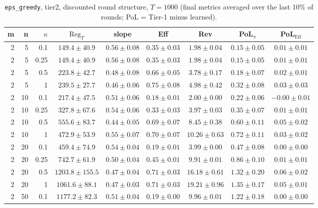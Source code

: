 \begin{table}[htbp]
\centering
\scriptsize
\caption{\texttt{eps\_greedy}, tier2, discounted round structure, $T=1000$ (final metrics averaged over the last 10\% of rounds; PoL = Tier-1 minus learned).}
\label{tab:tier2_eps_greedy_discounted}
\begin{tabular}{@{}rrrcccccc@{}}
\toprule
m & n & $\kappa$ & $\mathrm{Reg}_T$ & slope & Eff & Rev & PoL$_\pi$ & PoL$_\mathrm{Eff}$ \\
\midrule
2 & 5 & 0.1 & $149.4 \pm 40.9$ & $0.56 \pm 0.08$ & $0.35 \pm 0.03$ & $1.98 \pm 0.04$ & $0.15 \pm 0.05$ & $0.01 \pm 0.01$ \\
2 & 5 & 0.25 & $149.4 \pm 40.9$ & $0.56 \pm 0.08$ & $0.35 \pm 0.03$ & $1.98 \pm 0.04$ & $0.15 \pm 0.05$ & $0.01 \pm 0.01$ \\
2 & 5 & 0.5 & $223.8 \pm 42.7$ & $0.48 \pm 0.08$ & $0.66 \pm 0.05$ & $3.78 \pm 0.17$ & $0.18 \pm 0.07$ & $0.02 \pm 0.01$ \\
2 & 5 & 1 & $239.5 \pm 27.7$ & $0.46 \pm 0.06$ & $0.75 \pm 0.08$ & $4.98 \pm 0.42$ & $0.32 \pm 0.08$ & $0.03 \pm 0.03$ \\
2 & 10 & 0.1 & $217.4 \pm 47.5$ & $0.51 \pm 0.06$ & $0.18 \pm 0.01$ & $2.00 \pm 0.00$ & $0.22 \pm 0.06$ & $-0.00 \pm 0.01$ \\
2 & 10 & 0.25 & $327.8 \pm 67.6$ & $0.54 \pm 0.06$ & $0.33 \pm 0.03$ & $3.97 \pm 0.03$ & $0.35 \pm 0.07$ & $0.01 \pm 0.01$ \\
2 & 10 & 0.5 & $555.6 \pm 83.7$ & $0.44 \pm 0.05$ & $0.69 \pm 0.07$ & $8.45 \pm 0.38$ & $0.60 \pm 0.11$ & $0.05 \pm 0.02$ \\
2 & 10 & 1 & $472.9 \pm 53.9$ & $0.55 \pm 0.07$ & $0.70 \pm 0.07$ & $10.26 \pm 0.63$ & $0.72 \pm 0.11$ & $0.03 \pm 0.02$ \\
2 & 20 & 0.1 & $459.4 \pm 74.9$ & $0.54 \pm 0.04$ & $0.19 \pm 0.01$ & $3.99 \pm 0.00$ & $0.47 \pm 0.08$ & $0.00 \pm 0.00$ \\
2 & 20 & 0.25 & $742.7 \pm 61.9$ & $0.50 \pm 0.04$ & $0.45 \pm 0.01$ & $9.91 \pm 0.01$ & $0.86 \pm 0.10$ & $0.01 \pm 0.01$ \\
2 & 20 & 0.5 & $1203.8 \pm 155.5$ & $0.47 \pm 0.04$ & $0.71 \pm 0.03$ & $16.18 \pm 0.61$ & $1.32 \pm 0.20$ & $0.06 \pm 0.02$ \\
2 & 20 & 1 & $1061.6 \pm 88.1$ & $0.47 \pm 0.03$ & $0.71 \pm 0.03$ & $19.21 \pm 0.96$ & $1.35 \pm 0.17$ & $0.05 \pm 0.01$ \\
2 & 50 & 0.1 & $1177.2 \pm 82.3$ & $0.51 \pm 0.04$ & $0.19 \pm 0.00$ & $9.96 \pm 0.01$ & $1.22 \pm 0.18$ & $0.00 \pm 0.00$ \\

\end{tabular}
\end{table}
